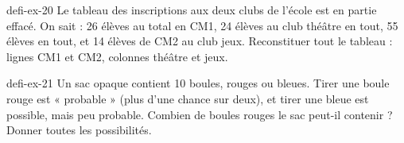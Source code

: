 \begin{blocEdition}{defi-ex-20}
Le tableau des inscriptions aux deux clubs de l’école est en partie effacé. On sait : 26 élèves au total en CM1, 24 élèves au club théâtre en tout, 55 élèves en tout, et 14 élèves de CM2 au club jeux. Reconstituer tout le tableau : lignes CM1 et CM2, colonnes théâtre et jeux.\par{}\par\par{}\par{}\par{}\par{}\par{}\par{}
\end{blocEdition}
\begin{blocEdition}{defi-ex-21}
Un sac opaque contient 10 boules, rouges ou bleues. Tirer une boule rouge est « probable » (plus d’une chance sur deux), et tirer une bleue est possible, mais peu probable. Combien de boules rouges le sac peut-il contenir ? Donner toutes les possibilités.\par{}\par\par{}\par{}\par{}\par{}\par{}\par{}
\end{blocEdition}
